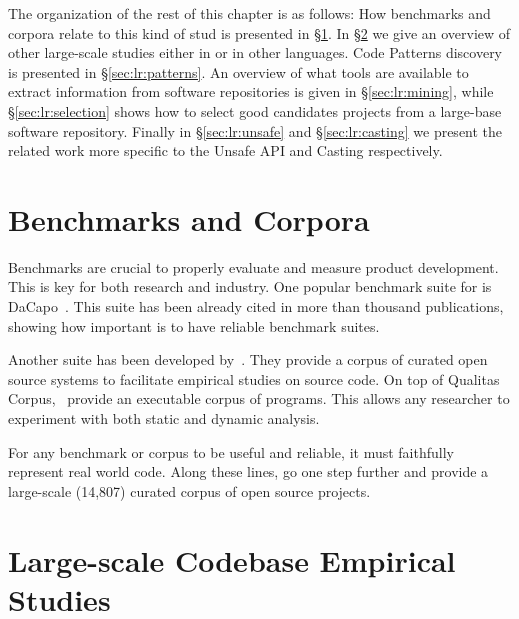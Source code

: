The organization of the rest of this chapter is as follows: 
How benchmarks and corpora relate to this kind of stud is presented in \S\ref{sec:lr:benchmarks}.
In \S\ref{sec:lr:largescale} we give an overview of other large-scale studies either in \java{} or in other languages.
Code Patterns discovery is presented in \S\ref{sec:lr:patterns}.
An overview of what tools are available to extract information from software repositories is given in \S\ref{sec:lr:mining},
while \S\ref{sec:lr:selection} shows how to select good candidates projects from a large-base software repository.
Finally in \S\ref{sec:lr:unsafe} and \S\ref{sec:lr:casting} we present the related work more specific to the Unsafe API and Casting respectively.


\section{Benchmarks and Corpora}
\label{sec:lr:benchmarks}

Benchmarks are crucial to properly evaluate and measure product development.
This is key for both research and industry.
One popular benchmark suite for \java{} is  DaCapo~\citep{blackburnDaCapoBenchmarksJava2006}.
This suite has been already cited in more than thousand publications, showing how important is to have reliable benchmark suites.

Another suite has been developed by~\cite{temperoQualitasCorpusCurated2010}.
They provide a corpus of curated open source systems to facilitate empirical studies on source code.
On top of Qualitas Corpus,~\cite{dietrichXCorpusExecutableCorpus2017} provide an executable corpus of \java{} programs.
This allows any researcher to experiment with both static and dynamic analysis.

For any benchmark or corpus to be useful and reliable, it must faithfully represent real world code.
Along these lines, \cite{allamanisMiningSourceCode2013} go one step further and provide a large-scale (14,807) curated corpus of open source \java{} projects.

\section{Large-scale Codebase Empirical Studies}
\label{sec:lr:largescale}

